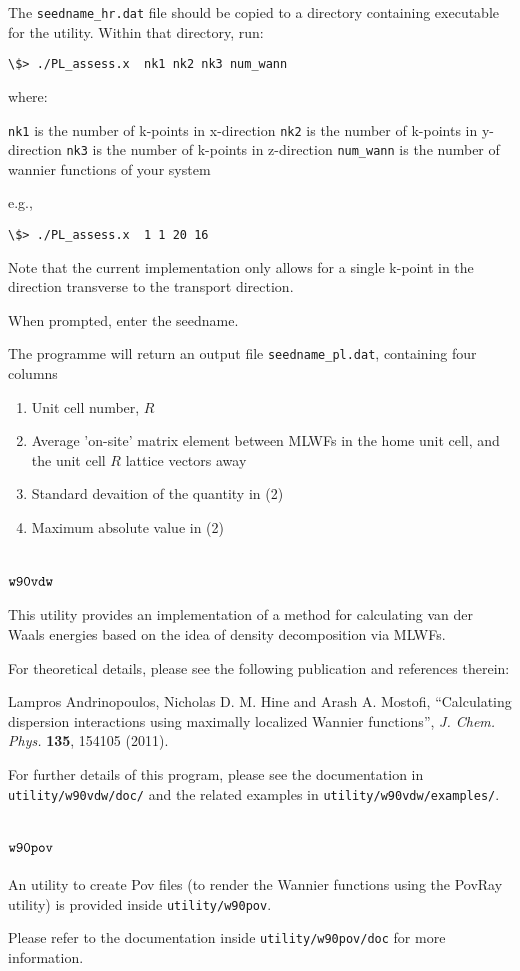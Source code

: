 The \verb|seedname_hr.dat| file should be copied to a directory containing
executable for the utility. Within that directory, run:

\begin{verbatim}
\$> ./PL_assess.x  nk1 nk2 nk3 num_wann 
\end{verbatim}

where:

 \verb|nk1| is the number of k-points in x-direction
 \verb|nk2| is the number of k-points in y-direction
 \verb|nk3| is the number of k-points in z-direction
 \verb|num_wann| is the number of wannier functions of your system

e.g.,

\begin{verbatim} 
\$> ./PL_assess.x  1 1 20 16
\end{verbatim}

Note that the current implementation only allows for a single k-point
in the direction transverse to the transport direction.

When prompted, enter the seedname.

The programme will return an output file \verb|seedname_pl.dat|, containing four columns
\begin{enumerate}
        \item Unit cell number, $R$
        \item Average 'on-site' matrix element between MLWFs in 
             the home unit cell, and the unit cell $R$ lattice
             vectors away
        \item Standard devaition of the quantity in (2)
        \item Maximum absolute value in (2)
\end{enumerate}

\section{$\tt{w90vdw}$}
\label{sec:w90vdw}

This utility provides an implementation of a method for calculating
van der Waals energies based on the idea of density decomposition via
MLWFs. 

For theoretical details, please see the following publication
and references therein:

Lampros Andrinopoulos, Nicholas D. M. Hine and Arash A. Mostofi, 
``Calculating dispersion interactions using maximally localized
Wannier functions'', \emph{J. Chem. Phys.} \textbf{135}, 154105 (2011).

For further details of this program, please see the documentation
in \verb|utility/w90vdw/doc/| and the related examples in
\verb|utility/w90vdw/examples/|.

\section{$\tt{w90pov}$}
\label{sec:w90pov}

An utility to create Pov files (to render the Wannier functions using
the PovRay utility) is provided inside \verb|utility/w90pov|.

Please refer to the documentation inside \verb|utility/w90pov/doc|
for more information.
